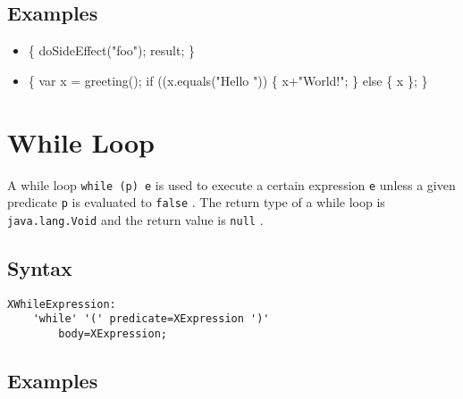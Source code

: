 \documentclass[a4paper,10pt]{scrreprt}
\newlength{\itemindentlen}
\begin{document}
\subsection{Examples}


\setlength{\itemindentlen}{\textwidth}
\begin{itemize}
\addtolength{\itemindentlen}{-2em}

\item \begin{minipage}[t]{\itemindentlen}

	\{
		doSideEffect("foo");
		result;
	\}
	
\end{minipage}

\item \begin{minipage}[t]{\itemindentlen}

	\{
		var x = greeting();
		if ((x.equals("Hello ")) \{
			x+"World!"; 
		\} else \{
			x
		\};
	\}
	
\end{minipage}

\end{itemize}
\addtolength{\itemindentlen}{2em}







\section{While Loop}
\label{WhileExpression}
A while loop \lstinline{while (p) e}
 is used to execute a certain expression \lstinline{e}
 unless a given predicate \lstinline{p}
 is evaluated to \lstinline{false}
.
The return type of a while loop is \lstinline{java.lang.Void}
 and the return value is \lstinline{null}
.

\subsection{Syntax}

\begin{lstlisting}
XWhileExpression:
	'while' '(' predicate=XExpression ')'
		body=XExpression;

\end{lstlisting}
 




\subsection{Examples}
\end{document}

